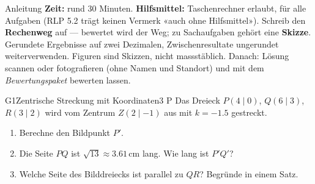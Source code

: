 \documentclass[11pt]{article}
\begin{document}

\begin{lpinfo}{Anleitung}
\textbf{Zeit:} rund 30 Minuten. \textbf{Hilfsmittel:} Taschenrechner erlaubt, für alle Aufgaben (RLP 5.2 trägt keinen Vermerk
«auch ohne Hilfsmittel»). Schreib den \textbf{Rechenweg} auf — bewertet wird der Weg; zu Sachaufgaben gehört eine
\textbf{Skizze}. Gerundete Ergebnisse auf zwei Dezimalen, Zwischenresultate ungerundet weiterverwenden.
Figuren sind Skizzen, nicht massstäblich.
Danach: Lösung scannen oder fotografieren (ohne Namen und Standort) und mit dem \emph{Bewertungspaket} bewerten lassen.
\end{lpinfo}

\begin{lpaufgabe}{G1}{Zentrische Streckung mit Koordinaten}{3 P}
Das Dreieck $P(4 \mid 0)$, $Q(6 \mid 3)$, $R(3 \mid 2)$ wird vom Zentrum $Z(2 \mid -1)$ aus mit $k = -1.5$ gestreckt.
\begin{enumerate}[label=(\alph*),leftmargin=*,itemsep=2pt]
\item Berechne den Bildpunkt $P'$.
\item Die Seite $PQ$ ist $\sqrt{13} \approx 3.61\,\text{cm}$ lang. Wie lang ist $P'Q'$?
\item Welche Seite des Bilddreiecks ist parallel zu $QR$? Begründe in einem Satz.
\end{enumerate}
\end{lpaufgabe}
\end{document}
